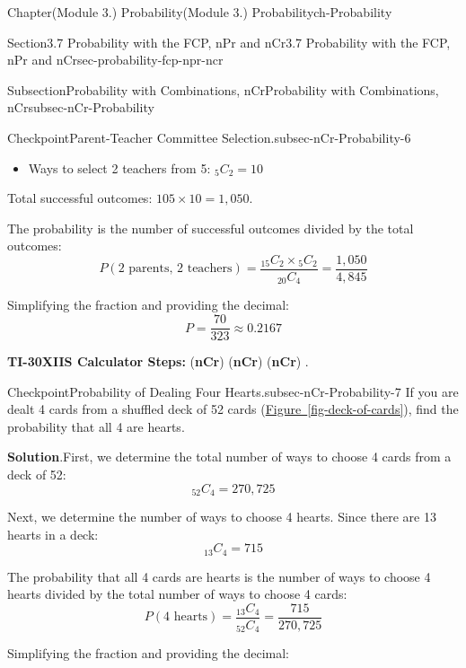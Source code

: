 \documentclass[oneside,10pt,]{book}
\newcommand{\blocktitlefont}{\relax}
\newcommand{\xreffont}{\relax}
\newcommand{\ptxlistdisc}{\raisebox{0.3ex}{\textbullet}}
\newcommand{\terminology}[1]{\textbf{#1}}
\newcommand{\kbd}[1]{\keys{{#1}}}
\begin{document}
\begin{chapterptx}{Chapter}{(Module 3.) Probability}{}{(Module 3.) Probability}{}{}{ch-Probability}
\begin{sectionptx}{Section}{3.7 Probability with the FCP, nPr and nCr}{}{3.7 Probability with the FCP, nPr and nCr}{}{}{sec-probability-fcp-npr-ncr}
\begin{subsectionptx}{Subsection}{Probability with Combinations, nCr}{}{Probability with Combinations, nCr}{}{}{subsec-nCr-Probability}
\begin{inlineexercise}{Checkpoint}{Parent-Teacher Committee Selection.}{subsec-nCr-Probability-6}
\begin{itemize}[label=\ptxlistdisc]
\item{}Ways to select 2 teachers from 5: \({}_{5}C_{2} = 10\)%
\end{itemize}
Total successful outcomes: \(105 \times 10 = 1,050\).%
\par
The probability is the number of successful outcomes divided by the total outcomes:%
\begin{equation*}
P(\text{2 parents, 2 teachers}) = \frac{{}_{15}C_{2} \times {}_{5}C_{2}}{{}_{20}C_{4}} = \frac{1,050}{4,845}
\end{equation*}
%
\par
Simplifying the fraction and providing the decimal:%
\begin{equation*}
P = \frac{70}{323} \approx 0.2167
\end{equation*}
%
\par
\terminology{TI-30XIIS Calculator Steps:} \kbd{15} \kbd{PRB} (\terminology{nCr}) \kbd{2} \kbd{×} \kbd{5} \kbd{PRB} (\terminology{nCr}) \kbd{2} \kbd{÷} \kbd{20} \kbd{PRB} (\terminology{nCr}) \kbd{4} \kbd{ENTER}.%
\end{inlineexercise}%
\begin{inlineexercise}{Checkpoint}{Probability of Dealing Four Hearts.}{subsec-nCr-Probability-7}%
If you are dealt 4 cards from a shuffled deck of 52 cards (\hyperref[fig-deck-of-cards]{Figure~{\xreffont\ref{fig-deck-of-cards}}}), find the probability that all 4 are hearts.%
\par\smallskip%
\noindent\textbf{\blocktitlefont Solution}.\hypertarget{subsec-nCr-Probability-7-3}{}\quad{}First, we determine the total number of ways to choose 4 cards from a deck of 52:%
\begin{equation*}
{}_{52}C_{4} = 270,725
\end{equation*}
%
\par
Next, we determine the number of ways to choose 4 hearts. Since there are 13 hearts in a deck:%
\begin{equation*}
{}_{13}C_{4} = 715
\end{equation*}
%
\par
The probability that all 4 cards are hearts is the number of ways to choose 4 hearts divided by the total number of ways to choose 4 cards:%
\begin{equation*}
P(\text{4 hearts}) = \frac{{}_{13}C_{4}}{{}_{52}C_{4}} = \frac{715}{270,725}
\end{equation*}
%
\par
Simplifying the fraction and providing the decimal:%
\begin{equation*}

\end{equation*}
\end{inlineexercise}
\end{subsectionptx}
\end{sectionptx}
\end{chapterptx}
\end{document}
